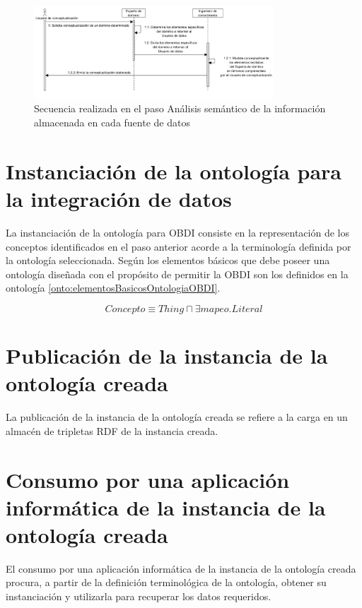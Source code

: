 \begin{figure}
\begin{center}
	\includegraphics[width=0.8\textwidth]{img/conceptsExtraction.png}
\end{center}
\caption{Secuencia realizada en el paso Análisis semántico de la información almacenada en cada fuente de datos}
\label{fig: conceptsExtraction}
\end{figure}

\section{Instanciación de la ontología para la integración de datos}

La instanciación de la ontología para OBDI consiste en la representación de los conceptos identificados en el paso anterior acorde a la terminología definida por la ontología seleccionada. Según \cite{Calvanese2017} los elementos básicos que debe poseer una ontología diseñada con el propósito de permitir la OBDI son los definidos en la ontología \ref{onto:elementosBasicosOntologiaOBDI}.

\begin{equation}
Concepto \equiv Thing \sqcap \exists mapeo.Literal
\label{onto:elementosBasicosOntologiaOBDI}
\end{equation}

\section{Publicación de la instancia de la ontología creada}

La publicación de la instancia de la ontología creada se refiere a la carga en un almacén de tripletas RDF de la instancia creada.

\section{Consumo por una aplicación informática de la instancia de la ontología creada}

El consumo por una aplicación informática de la instancia de la ontología creada procura, a partir de la definición terminológica de la ontología, obtener su instanciación y utilizarla para recuperar los datos requeridos.







